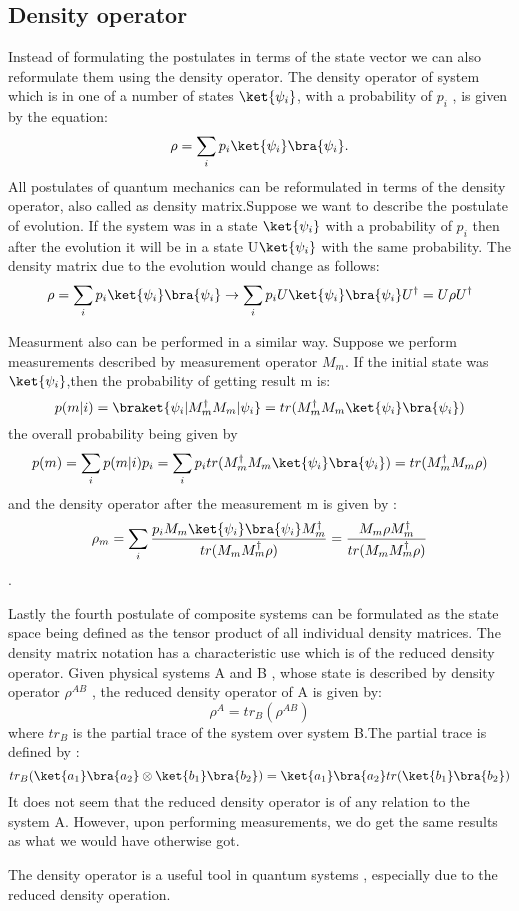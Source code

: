 \subsection{Density operator}
Instead of formulating  the postulates in terms of the state vector we can also reformulate them using the density operator.
The density operator of system which is in one of a number of states $\ket{\psi_i}$, with a probability of $p_i$ , is given by the equation:
$$\rho = \sum_i p_i\ket{\psi_i}\bra{\psi_i}.$$
All postulates of quantum mechanics can be reformulated in terms of the density operator, also called as density matrix.Suppose we want to describe the postulate of evolution. If the system was in a state $\ket{\psi_i}$ with a probability of $p_i$ then after the evolution it will be in a state U$\ket{\psi_i}$ with the same probability.
The density matrix due to the evolution would change as follows:
$$ \rho = \sum_i p_i\ket{\psi_i}\bra{\psi_i} \to \sum_i p_iU\ket{\psi_i}\bra{\psi_i}U^{\dagger}  = U\rho U^{\dagger}$$

Measurment also can be performed in a similar way. Suppose we perform measurements described by measurement operator $M_m$. If the initial state was $\ket{\psi_i}$,then the probability of getting result m is:
$$p(m|i) = \braket{\psi_i|M_m^{\dagger}M_m|\psi_i} = tr(M_m^{\dagger}M_m \ket{\psi_i}\bra{\psi_i})$$
the overall probability being given by 
$$p(m) = \sum_i p(m|i)p_i = \sum_i p_itr(M_m^{\dagger}M_m \ket{\psi_i}\bra{\psi_i}) = tr(M_m^{\dagger}M_m\rho)$$
and the density operator after the measurement m is given by :
$$\rho_m = \sum_i \frac{p_i M_m \ket{\psi_i}\bra{\psi_i}M_m^{\dagger}}{tr(M_mM_m^{\dagger}\rho)} = \frac{M_m \rho M_m^{\dagger}}{tr(M_mM_m^{\dagger}\rho)} $$.
\par 
Lastly the fourth postulate of composite systems can be formulated as the state space being defined as the tensor product of all individual density matrices.\newpage
The density matrix notation has a characteristic use which is of the reduced density operator. Given physical systems A and B , whose state is described by density operator $\rho^{AB}$ , the reduced density operator of A is given by:
$$ \rho ^A = tr_B(\rho^{AB}) $$
where $tr_B$ is the partial trace of the system over system B.The partial trace is defined by :
$$tr_B (\ket{a_1}\bra{a_2}\otimes \ket{b_1}\bra{b_2}) = \ket{a_1}\bra{a_2} tr(\ket{b_1}\bra{b_2})$$
It does not seem that the reduced density operator is of any relation to the system A. However, upon performing measurements, we do get the same results as what we would have otherwise got. \par
The density operator is a useful tool in quantum systems , especially due to the reduced density operation.

